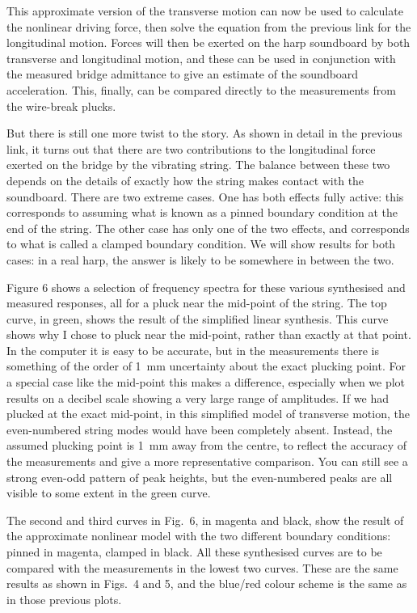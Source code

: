   This approximate version of the transverse motion can now be used to 
  calculate the nonlinear driving force, then solve the equation from the 
  previous link for the longitudinal motion. Forces will then be exerted on the 
  harp soundboard by both transverse and longitudinal motion, and these can be 
  used in conjunction with the measured bridge admittance to give an estimate 
  of the soundboard acceleration. This, finally, can be compared directly to 
  the measurements from the wire-break plucks. 

  But there is still one more twist to the story. As shown in detail in the 
  previous link, it turns out that there are two contributions to the 
  longitudinal force exerted on the bridge by the vibrating string. The balance 
  between these two depends on the details of exactly how the string makes 
  contact with the soundboard. There are two extreme cases. One has both 
  effects fully active: this corresponds to assuming what is known as a pinned 
  boundary condition at the end of the string. The other case has only one of 
  the two effects, and corresponds to what is called a clamped boundary 
  condition. We will show results for both cases: in a real harp, the answer is 
  likely to be somewhere in between the two. 

  Figure 6 shows a selection of frequency spectra for these various synthesised 
  and measured responses, all for a pluck near the mid-point of the string. The 
  top curve, in green, shows the result of the simplified linear synthesis. 
  This curve shows why I chose to pluck near the mid-point, rather than exactly 
  at that point. In the computer it is easy to be accurate, but in the 
  measurements there is something of the order of 1~mm uncertainty about the 
  exact plucking point. For a special case like the mid-point this makes a 
  difference, especially when we plot results on a decibel scale showing a very 
  large range of amplitudes. If we had plucked at the exact mid-point, in this 
  simplified model of transverse motion, the even-numbered string modes would 
  have been completely absent. Instead, the assumed plucking point is 1~mm away 
  from the centre, to reflect the accuracy of the measurements and give a more 
  representative comparison. You can still see a strong even-odd pattern of 
  peak heights, but the even-numbered peaks are all visible to some extent in 
  the green curve. 

  The second and third curves in Fig.\ 6, in magenta and black, show the result 
  of the approximate nonlinear model with the two different boundary 
  conditions: pinned in magenta, clamped in black. All these synthesised curves 
  are to be compared with the measurements in the lowest two curves. These are 
  the same results as shown in Figs.\ 4 and 5, and the blue/red colour scheme 
  is the same as in those previous plots. 

